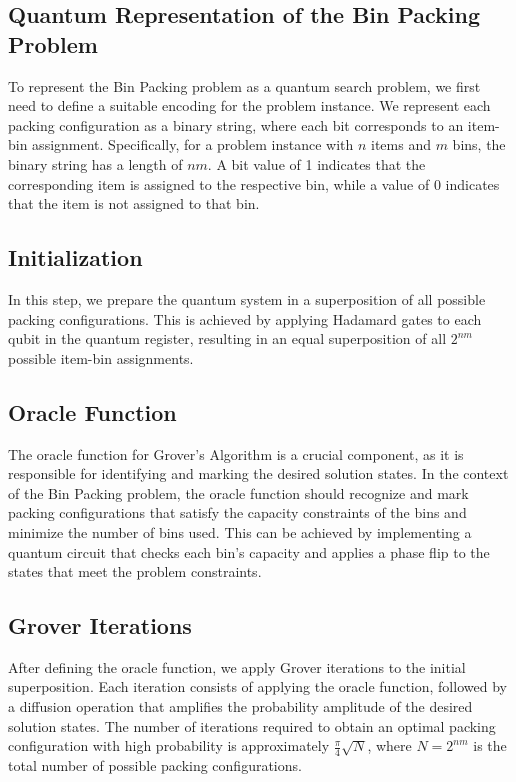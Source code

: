 \subsection{Quantum Representation of the Bin Packing Problem}

To represent the Bin Packing problem as a quantum search problem, we first need to define a suitable encoding for the problem instance. We represent each packing configuration as a binary string, where each bit corresponds to an item-bin assignment. Specifically, for a problem instance with $n$ items and $m$ bins, the binary string has a length of $nm$. A bit value of 1 indicates that the corresponding item is assigned to the respective bin, while a value of 0 indicates that the item is not assigned to that bin.

\subsection{Initialization}

In this step, we prepare the quantum system in a superposition of all possible packing configurations. This is achieved by applying Hadamard gates to each qubit in the quantum register, resulting in an equal superposition of all $2^{nm}$ possible item-bin assignments.

\subsection{Oracle Function}

The oracle function for Grover's Algorithm is a crucial component, as it is responsible for identifying and marking the desired solution states. In the context of the Bin Packing problem, the oracle function should recognize and mark packing configurations that satisfy the capacity constraints of the bins and minimize the number of bins used. This can be achieved by implementing a quantum circuit that checks each bin's capacity and applies a phase flip to the states that meet the problem constraints.

\subsection{Grover Iterations}

After defining the oracle function, we apply Grover iterations to the initial superposition. Each iteration consists of applying the oracle function, followed by a diffusion operation that amplifies the probability amplitude of the desired solution states. The number of iterations required to obtain an optimal packing configuration with high probability is approximately $\frac{\pi}{4}\sqrt{N}$, where $N = 2^{nm}$ is the total number of possible packing configurations.

